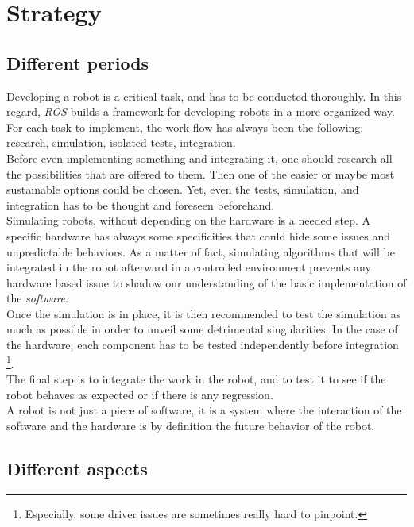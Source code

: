 	\section{Strategy}
	
		\subsection{Different periods}

		Developing a robot is a critical task, and has to be conducted thoroughly. 
		In this regard, \textit{ROS} builds a framework for developing 
		robots in a more organized way. For each task to implement, 
		the work-flow has always been the following: research, simulation, isolated 
		tests, integration.
		\\\indent Before even implementing something and integrating it, one should 
		research all the possibilities that are offered to them. Then one of the 
		easier or maybe most sustainable options could be chosen. Yet, even the
		tests, simulation, and integration has to be thought and foreseen beforehand.
		\\\indent Simulating robots, without depending on the hardware is
		a needed step.	 A specific hardware has always some specificities that
		could hide some issues and unpredictable behaviors. As a matter of fact, 
		simulating algorithms that will be integrated in the robot afterward in 
		a controlled environment prevents any hardware based issue to shadow
		our understanding of the basic implementation of
		the \textit{software}.
		\\\indent Once the simulation is in place, it is then 
		recommended to test the simulation as much as possible in order
		to unveil some detrimental singularities. In the case of the hardware, 
		each component has to be tested independently before integration
		\footnote{Especially, some driver issues are sometimes really 
		hard to pinpoint.}.
		\\\indent The final step is to integrate the work in the robot, and
		to test it to see if the robot behaves as expected or if there 
		is any regression.
		\\\indent A robot is not just a piece of software, it is a system 
		where the interaction of the software and the hardware is by 
		definition the future behavior of the robot.
		
		\subsection{Different aspects}

